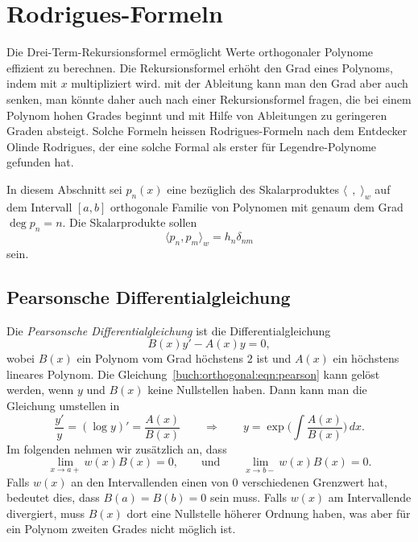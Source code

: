 %
%
%
\section{Rodrigues-Formeln
\label{buch:orthogonalitaet:section:rodrigues}}
Die Drei-Term-Rekursionsformel ermöglicht Werte orthogonaler Polynome
effizient zu berechnen.
Die Rekursionsformel erhöht den Grad eines Polynoms, indem mit $x$ 
multipliziert wird.
mit der Ableitung kann man den Grad aber auch senken, man könnte daher
auch nach einer Rekursionsformel fragen, die bei einem Polynom hohen
Grades beginnt und mit Hilfe von Ableitungen zu geringeren Graden
absteigt.
Solche Formeln heissen Rodrigues-Formeln nach dem Entdecker Olinde
Rodrigues, der eine solche Formal als erster für Legendre-Polynome
gefunden hat.

In diesem Abschnitt sei $p_n(x)$ eine bezüglich des Skalarproduktes
$\langle\,\;,\;\rangle_w$ auf dem Intervall $[a,b]$ orthogonale Familie
von Polynomen mit genaum dem Grad $\deg p_n=n$.
Die Skalarprodukte sollen 
\[
\langle p_n,p_m\rangle_w = h_n\delta_{nm}
\]
sein.

\subsection{Pearsonsche Differentialgleichung}
Die {\em Pearsonsche Differentialgleichung} ist die Differentialgleichung
\begin{equation}
B(x) y' - A(x) y = 0,
\label{buch:orthogonal:eqn:pearson}
\end{equation}
wobei $B(x)$ ein Polynom vom Grad höchstens $2$ ist und $A(x)$ ein
höchstens lineares Polynom.
Die Gleichung~\eqref{buch:orthogonal:eqn:pearson}
kann gelöst werden, wenn $y$ und $B(x)$ keine Nullstellen  haben.
Dann kann man die Gleichung umstellen in
\[
\frac{y'}{y}
=
(\log y)'
=
\frac{A(x)}{B(x)}
\qquad\Rightarrow\qquad
y = \exp\biggl( \int\frac{A(x)}{B(x)}\biggr)\,dx.
\]
Im folgenden nehmen wir zusätzlich an, dass
\begin{equation}
\lim_{x\to a+} w(x)B(x) = 0,
\qquad\text{und}\qquad
\lim_{x\to b-} w(x)B(x) = 0.
\end{equation}
Falls $w(x)$ an den Intervallenden einen von $0$ verschiedenen
Grenzwert hat, bedeutet dies, dass $B(a)=B(b)=0$ sein muss.
Falls $w(x)$ am Intervallende divergiert, muss $B(x)$ dort eine
Nullstelle höherer Ordnung haben, was aber für ein Polynom
zweiten Grades nicht möglich ist.

